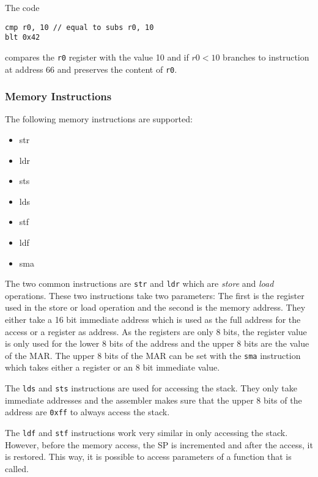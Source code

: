 The code
\begin{verbatim}
cmp r0, 10 // equal to subs r0, 10
blt 0x42
\end{verbatim}
compares the \texttt{r0} register with the value 10 and if $r0 < 10$ branches to instruction at address 66 and preserves the content of \texttt{r0}.

\subsubsection{Memory Instructions}\label{sec:memInstr}
The following memory instructions are supported:
\begin{multicols}{4}
  \begin{itemize}
    \item str
    \item ldr
    \item sts
    \item lds
    \item stf
    \item ldf
    \item sma
  \end{itemize}
\end{multicols}

The two common instructions are \texttt{str} and \texttt{ldr} which are \emph{store} and \emph{load} operations.
These two instructions take two parameters:
The first is the register used in the store or load operation and the second is the memory address.
They either take a 16 bit immediate address which is used as the full address for the access or a register as address.
As the registers are only 8 bits, the register value is only used for the lower 8 bits of the address and the upper 8 bits are the value of the \gls{MAR}.
The upper 8 bits of the \gls{MAR} can be set with the \texttt{sma} instruction which takes either a register or an 8 bit immediate value.

The \texttt{lds} and \texttt{sts} instructions are used for accessing the stack.
They only take immediate addresses and the assembler makes sure that the upper 8 bits of the address are \texttt{0xff} to always access the stack.

The \texttt{ldf} and \texttt{stf} instructions work very similar in only accessing the stack.
However, before the memory access, the \gls{SP} is incremented and after the access, it is restored.
This way, it is possible to access parameters of a function that is called.

